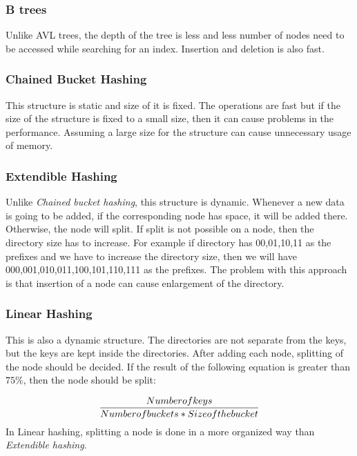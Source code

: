\documentclass{report}
\begin{document}
\subsubsection{B trees}

Unlike AVL trees, the depth of the tree is less and less number of nodes need to be accessed while searching for an index. Insertion and deletion is also fast.

\subsubsection{Chained Bucket Hashing}

This structure is static and size of it is fixed. The operations are fast but if the size of the structure is fixed to a small size, then it can cause problems in the performance. Assuming a large size for the structure can cause unnecessary usage of memory.

\subsubsection{Extendible Hashing}

Unlike \textit{Chained bucket hashing}, this structure is dynamic. Whenever a new data is going to be added, if the corresponding node has space, it will be added there. Otherwise, the node will split. If split is not possible on a node, then the directory size has to increase. For example if directory has 00,01,10,11 as the prefixes and we have to increase the directory size, then we will have 000,001,010,011,100,101,110,111 as the prefixes. The problem with this approach is that insertion of a node can cause enlargement of the directory.  

\subsubsection{Linear Hashing}

This is also a dynamic structure. The directories are not separate from the keys, but the keys are kept inside the directories. After adding each node,  splitting of the node should be decided. If the result of the following equation is greater than $75\%$, then the node should be split:

\begin{equation}
\frac{Number of keys}{Number of buckets * Size of the bucket} \\
\end{equation}   
In Linear hashing, splitting a node is done in a more organized way than \textit{Extendible hashing}.
\end{document}
